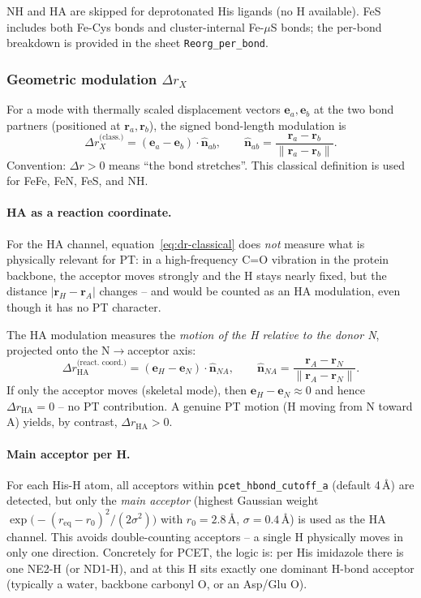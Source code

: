 \documentclass[11pt,a4paper,twoside]{article}
\theoremstyle{remark}
\begin{document}
NH and HA are skipped for deprotonated His ligands (no H
available). FeS includes both Fe-Cys bonds and cluster-internal
Fe-$\mu$S bonds; the per-bond breakdown is provided in the sheet
\texttt{Reorg\_per\_bond}.

\subsubsection*{Geometric modulation $\Delta r_X$}

For a mode with thermally scaled displacement vectors
$\mathbf{e}_a, \mathbf{e}_b$ at the two bond partners (positioned
at $\mathbf{r}_a, \mathbf{r}_b$), the signed bond-length modulation is
\begin{equation}
  \Delta r_X^\text{(class.)}
  = (\mathbf{e}_a - \mathbf{e}_b) \cdot \hat{\mathbf{n}}_{ab},
  \qquad
  \hat{\mathbf{n}}_{ab} = \frac{\mathbf{r}_a - \mathbf{r}_b}{\|\mathbf{r}_a - \mathbf{r}_b\|}.
  \label{eq:dr-classical}
\end{equation}
Convention: $\Delta r > 0$ means ``the bond stretches''.
This classical definition is used for FeFe, FeN, FeS, and NH.

\paragraph{HA as a reaction coordinate.}
For the HA channel, equation~\ref{eq:dr-classical} does \emph{not}
measure what is physically relevant for PT: in a high-frequency
C=O vibration in the protein backbone, the acceptor moves
strongly and the H stays nearly fixed, but the distance
$|\mathbf{r}_H - \mathbf{r}_A|$ changes -- and would be counted
as an HA modulation, even though it has no PT character.

The HA modulation measures the
\emph{motion of the H relative to the donor N}, projected onto
the N$\to$acceptor axis:
\begin{equation}
  \Delta r_\text{HA}^\text{(react.\ coord.)}
  = (\mathbf{e}_H - \mathbf{e}_N) \cdot \hat{\mathbf{n}}_{NA},
  \qquad
  \hat{\mathbf{n}}_{NA} = \frac{\mathbf{r}_A - \mathbf{r}_N}{\|\mathbf{r}_A - \mathbf{r}_N\|}.
  \label{eq:dr-reaction-coord}
\end{equation}
If only the acceptor moves (skeletal mode), then
$\mathbf{e}_H - \mathbf{e}_N \approx 0$ and hence
$\Delta r_\text{HA} = 0$ -- no PT contribution. A genuine PT
motion (H moving from N toward A) yields, by contrast,
$\Delta r_\text{HA} > 0$.

\paragraph{Main acceptor per H.}
For each His-H atom, all acceptors within
\texttt{pcet\_hbond\_cutoff\_a} (default 4\,\AA) are detected, but
only the \emph{main acceptor} (highest Gaussian weight
$\exp\bigl(-(r_{\text{eq}} - r_0)^2/(2\sigma^2)\bigr)$ with
$r_0 = 2.8$\,\AA, $\sigma = 0.4$\,\AA) is used as the HA channel.
This avoids double-counting acceptors -- a single H physically
moves in only one direction. Concretely for PCET, the logic is:
per His imidazole there is one NE2-H (or ND1-H), and at this H
sits exactly one dominant H-bond acceptor (typically a water,
backbone carbonyl O, or an Asp/Glu O).
\end{document}
